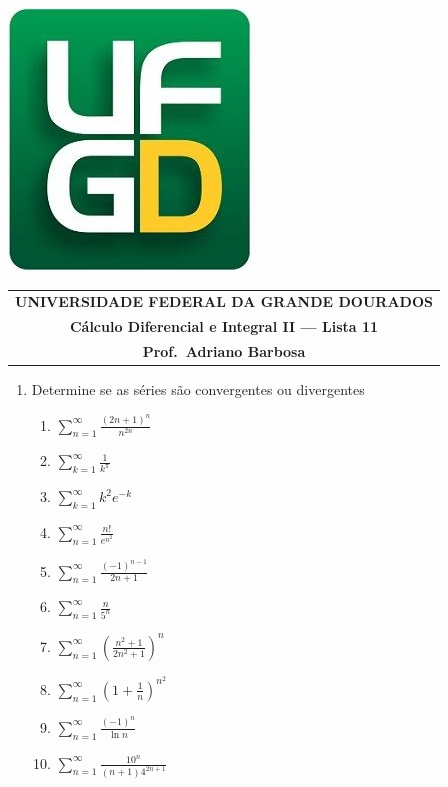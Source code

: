 \documentclass[a4paper,5pt]{amsbook}
\newcommand{\ds}{\displaystyle}
\begin{document}
\thispagestyle{empty}
\pagestyle{empty}
\begin{minipage}[h]{0.14\textwidth}
    \includegraphics[scale=0.24]{../../ufgd.png}
\end{minipage}
\begin{minipage}[h]{\textwidth}
    \begin{tabular}{c}
        {{\bf UNIVERSIDADE FEDERAL DA GRANDE DOURADOS}}\\
        {{\bf C\'{a}lculo Diferencial e Integral II --- Lista 11}}\\
        {{\bf Prof.\ Adriano Barbosa}}\\
    \end{tabular}
    \vspace{-0.45cm}
\end{minipage}


\vspace{1cm}
\begin{enumerate}
    \setlength\itemsep{0.5cm}
    \item Determine se as s\'eries s\~ao convergentes ou divergentes
    	\begin{enumerate}
            \setlength\itemsep{0.2cm}
    		\item $\ds\sum_{n=1}^\infty \frac{(2n+1)^n}{n^{2n}}$
    		\item $\ds\sum_{k=1}^\infty \frac{1}{k^\pi}$
    		\item $\ds\sum_{k=1}^\infty k^2 e^{-k}$
    		\item $\ds\sum_{n=1}^\infty \frac{n!}{e^{n^2}}$
            \item $\ds\sum_{n=1}^\infty \frac{(-1)^{n-1}}{2n+1}$
            \item $\ds\sum_{n=1}^\infty \frac{n}{5^n}$
            \item $\ds\sum_{n=1}^\infty \left(\frac{n^2+1}{2n^2+1}\right)^n$
            \item $\ds\sum_{n=1}^\infty \left(1+\frac{1}{n}\right)^{n^2}$
            \item $\ds\sum_{n=1}^\infty \frac{(-1)^n}{\ln{n}}$
            \item $\ds\sum_{n=1}^\infty \frac{10^n}{(n+1)4^{2n+1}}$
    	\end{enumerate}
\end{enumerate}
\end{document}
